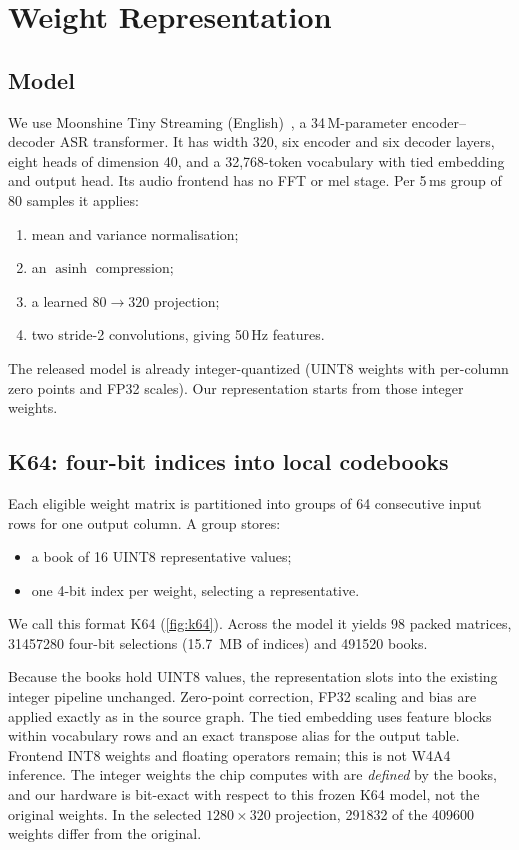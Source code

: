 \section{Weight Representation}
\label{sec:representation}

\subsection{Model}
We use Moonshine Tiny Streaming (English)~\cite{jeffries2024moonshine}, a 34\,M-parameter encoder--decoder ASR transformer. It has width 320, six encoder and six decoder layers, eight heads of dimension 40, and a 32,768-token vocabulary with tied embedding and output head. Its audio frontend has no FFT or mel stage. Per 5\,ms group of 80 samples it applies:
\begin{enumerate}
\item mean and variance normalisation;
\item an $\operatorname{asinh}$ compression;
\item a learned $80{\to}320$ projection;
\item two stride-2 convolutions, giving 50\,Hz features.
\end{enumerate}
The released model is already integer-quantized (UINT8 weights with per-column zero points and FP32 scales). Our representation starts from those integer weights.

\subsection{K64: four-bit indices into local codebooks}
Each eligible weight matrix is partitioned into groups of 64 consecutive input rows for one output column. A group stores:
\begin{itemize}
\item a book of 16 UINT8 representative values;
\item one 4-bit index per weight, selecting a representative.
\end{itemize}

We call this format K64 (\cref{fig:k64}). Across the model it yields 98 packed matrices, \num{31457280} four-bit selections (\SI{15.7}{MB} of indices) and \num{491520} books.

Because the books hold UINT8 values, the representation slots into the existing integer pipeline unchanged. Zero-point correction, FP32 scaling and bias are applied exactly as in the source graph. The tied embedding uses feature blocks within vocabulary rows and an exact transpose alias for the output table. Frontend INT8 weights and floating operators remain; this is not W4A4 inference. The integer weights the chip computes with are \emph{defined} by the books, and our hardware is bit-exact with respect to this frozen K64 model, not the original weights. In the selected $1280\times320$ projection, \num{291832} of the \num{409600} weights differ from the original.

